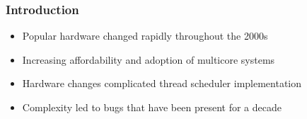 \documentclass{beamer}
\newcommand{\linespace}{\vskip 0.25cm}
\begin{document}
\begin{frame}
\frametitle{Introduction}

\begin{itemize}
\item Popular hardware changed rapidly throughout the 2000s

\linespace

\item Increasing affordability and adoption of multicore systems

\linespace

\item Hardware changes complicated thread scheduler implementation

\linespace

\item Complexity led to bugs that have been present for a decade
\end{itemize}
\end{frame}
\end{document}
